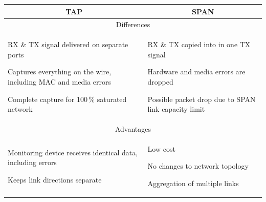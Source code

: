 \begin{table}[t!]
    \centering
    \begin{tabularx}{\textwidth}{XX}
    \toprule
        \multicolumn{1}{c}{\textbf{TAP}}  & \multicolumn{1}{c}{\textbf{SPAN}} \\ \midrule[1pt]
        
        \multicolumn{2}{c}{Differences} \\ \midrule
        \begin{compactitem}
            \item RX \& TX signal delivered on separate ports
            \item Captures everything on the wire, including MAC and media errors
            \item Complete capture for 100\,\% saturated network
        \end{compactitem}
        &
        \begin{compactitem}
            \item RX \& TX copied into in one TX signal
            \item Hardware and media errors are dropped
            \item Possible packet drop due to SPAN link capacity limit
        \end{compactitem}
        \\ \midrule
        
        \multicolumn{2}{c}{Advantages} \\ \midrule
        \begin{compactitem}
            \item Monitoring device receives identical data, including errors
            \item Keeps link directions separate
        \end{compactitem}
        & 
        \begin{compactitem}
            \item Low cost 
            \item No changes to network topology
            \item Aggregation of multiple links
        \end{compactitem}
        \\ \midrule
        

\end{tabularx}
\end{table}
